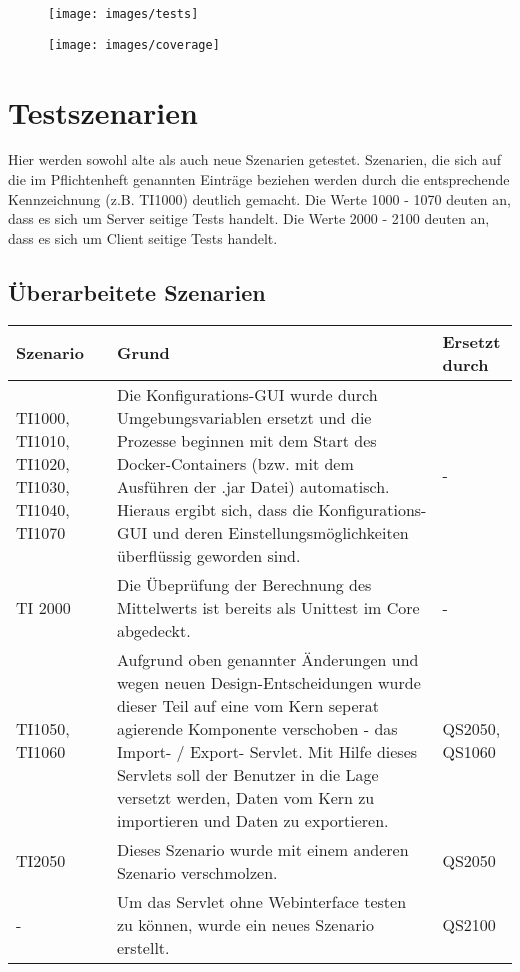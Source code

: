 \newpage

\begin{figure}
	\centering\texttt{[image: images/tests]}
\end{figure}

\newpage

\begin{figure}
	\centering\texttt{[image: images/coverage]}
\end{figure}

\newpage
\section{Testszenarien}
Hier werden sowohl alte als auch neue Szenarien getestet.
Szenarien, die sich auf die im Pflichtenheft genannten Eintr\"age beziehen werden durch die entsprechende Kennzeichnung (z.B. TI1000) deutlich gemacht. \newline
Die Werte 1000 - 1070 deuten an, dass es sich um Server seitige Tests handelt. \newline
Die Werte 2000 - 2100 deuten an, dass es sich um Client seitige Tests handelt.

\subsection{\"Uberarbeitete Szenarien}
\begin{table}[H]
\centering
\begin{tabular}{|L{1.3cm}|L{7cm}|L{2cm}|}
\hline
Szenario & Grund & Ersetzt durch\\
\hline
TI1000, TI1010, TI1020, TI1030, TI1040, TI1070 & Die Konfigurations-GUI wurde durch Umgebungsvariablen ersetzt und die Prozesse beginnen mit dem Start des Docker-Containers (bzw. mit dem Ausf\"uhren der .jar Datei) automatisch.
\newline
Hieraus ergibt sich, dass die Konfigurations-GUI und deren Einstellungsm\"oglichkeiten \"uberfl\"ussig geworden sind. & - \\ \hline
TI 2000 & Die Übeprüfung der Berechnung des Mittelwerts ist bereits als Unittest im Core abgedeckt. & - \\ \hline
TI1050, TI1060 & Aufgrund oben genannter \"Anderungen und wegen neuen Design-Entscheidungen wurde dieser Teil auf eine vom Kern seperat agierende Komponente verschoben - das Import- / Export- Servlet.
\newline
Mit Hilfe dieses Servlets soll der Benutzer in die Lage versetzt werden, Daten vom Kern zu importieren und Daten zu exportieren. & QS2050, QS1060 \\ \hline
TI2050 & Dieses Szenario wurde mit einem anderen Szenario verschmolzen. & QS2050 \\ \hline
- & Um das Servlet ohne Webinterface testen zu können, wurde ein neues Szenario erstellt. & QS2100 \\ \hline
\end{tabular}
\end{table}

